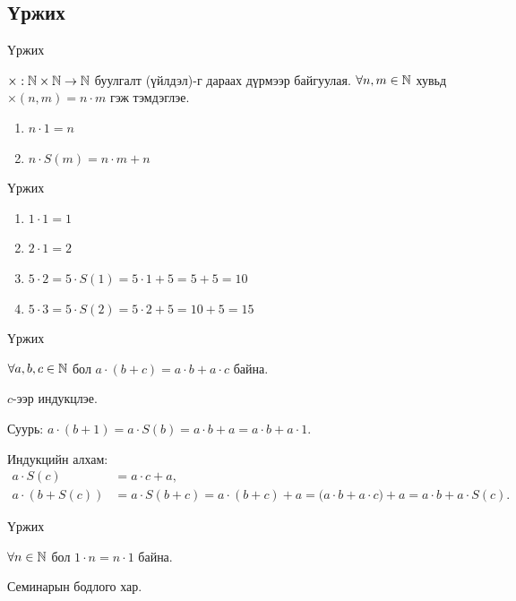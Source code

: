 \subsection{Үржих}
\begin{frame}[allowframebreaks]{Үржих}
 \begin{definition} $ \times : \mathbb{N}\times \mathbb{N}\to\mathbb{N}$ буулгалт (үйлдэл)-г дараах дүрмээр байгуулая. $\forall n , m\in\mathbb{N}$ хувьд $\times(n,m)=n\cdot m$ гэж тэмдэглэе.
\begin{enumerate}[label=\textbf{U\arabic*})]
    \item $ n\cdot 1= n$
    \item $n\cdot S(m)=n\cdot m+n$
\end{enumerate} 
\end{definition}
\end{frame}

\begin{frame}[allowframebreaks]{Үржих}
\begin{example}
    \begin{enumerate}
    \item $1\cdot 1=1$
    \item $2\cdot 1=2$
    \item $5\cdot 2=5\cdot S(1)=5\cdot 1+5=5+5=10$
    \item $5\cdot 3=5\cdot S(2)=5\cdot 2+5=10+5=15$
    \end{enumerate}
\end{example}
\end{frame}

\begin{frame}[allowframebreaks]{Үржих}
\begin{theorem}[Дистрибутив]\label{distributive}
$\forall a,b,c\in\mathbb{N}$ бол $a\cdot(b+c)=a\cdot b+a\cdot c$ байна.
\end{theorem}
\begin{prof}
$c$-ээр индукцлэе. 

Суурь: $a\cdot(b+1)=a\cdot S(b)=a\cdot b+a=a\cdot b+a\cdot 1$. 

Индукцийн алхам:
\begin{align*}
a\cdot S(c)&=a\cdot c+a,\\
a\cdot(b+S(c))&=a\cdot S(b+c)=a\cdot(b+c)+a=\big(a\cdot b+a\cdot c\big)+a= a\cdot b+a\cdot S(c).
\end{align*}
\end{prof}
\end{frame}

\begin{frame}[allowframebreaks]{Үржих}
\begin{theorem}\label{urjih 1}
$\forall n\in\mathbb{N}$ бол $1\cdot n=n\cdot 1$ байна.
\end{theorem}
\begin{prof}
     Семинарын бодлого хар.
\end{prof}
\end{frame}

